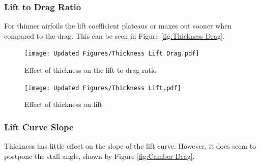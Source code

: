 \documentclass{article}
\begin{document}
\subsubsection{Lift to Drag Ratio}
For thinner airfoils the lift coefficient plateaus or maxes out sooner when compared to the drag. This can be seen in Figure \ref{fig:Thickness Drag}.

\begin{figure}[h]
    \centering
\begin{minipage}[b]{0.45\textwidth}
\centering
\texttt{[image: Updated Figures/Thickness Lift Drag.pdf]}
\caption{Effect of thickness on the lift to drag ratio}
\label{fig:Thickness Drag}
\end{minipage}
\begin{minipage}[b]{0.45\textwidth}
\centering
\texttt{[image: Updated Figures/Thickness Lift.pdf]}
\caption{Effect of thickness on lift}
\label{fig:Thickness Lift}
\end{minipage}
\end{figure}

\subsubsection{Lift Curve Slope}
Thickness has little effect on the slope of the lift curve. However, it does seem to postpone the stall angle, shown by Figure \ref{fig:Camber Drag}.




\clearpage
\end{document}
